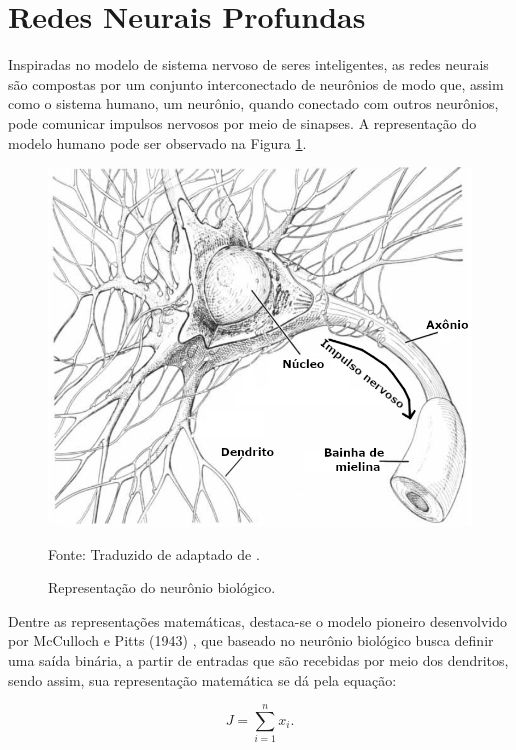 \newpage
\clearpage
\section{Redes Neurais Profundas}
\label{deep:deep}

Inspiradas no modelo de sistema nervoso de seres inteligentes, as redes neurais são compostas por um conjunto interconectado de neurônios de modo que, assim como o sistema humano, um neurônio, quando conectado com outros neurônios, pode comunicar impulsos nervosos por meio de sinapses. A representação do modelo humano pode ser observado na Figura \ref{deep:fig:1}.

\begin{figure}[H]
    \centering
    \caption{Representação do neurônio biológico.}
    \includegraphics[width=1\linewidth]{recursos/imagens/deep/neuronio.png}
    \label{deep:fig:1}

    \vspace*{1 cm}
    Fonte: Traduzido de adaptado de \cite{Stevens1979}.
\end{figure}

Dentre as representações matemáticas, destaca-se o modelo pioneiro desenvolvido por McCulloch e Pitts (1943) \cite{mcculloch1943logical}, que baseado no neurônio biológico busca definir uma saída binária, a partir de entradas que são recebidas por meio dos dendritos, sendo assim, sua representação matemática se dá pela equação:

\begin{equation}
    \label{deep:eq:1}
    J = \sum_{i = 1}^{n} x_i.
\end{equation}


